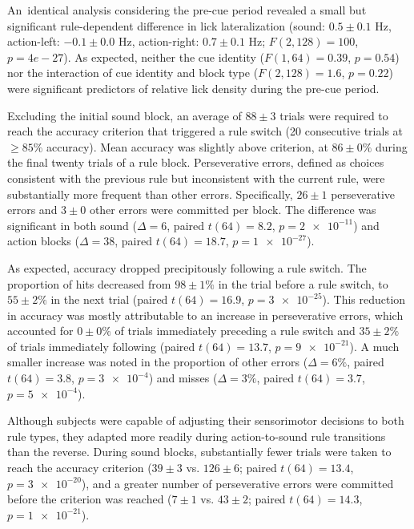 An\ identical analysis considering the pre-cue period revealed a small but significant  rule-dependent difference in lick lateralization (sound: $0.5 \pm 0.1$ Hz, action-left: $-0.1 \pm 0.0$ Hz, action-right: $0.7 \pm 0.1$ Hz; $F(2,128) =100$, $p=4e-27$). As expected, neither the cue identity ($F(1,64) =0.39$, $p=0.54$) nor the interaction of cue identity and block type ($F(2,128) =1.6$, $p=\num{0.22}$) were significant predictors of relative lick density during the pre-cue period.

Excluding the initial sound block, an average of $88 \pm 3$ trials were required to reach the accuracy criterion that triggered a rule switch (20 consecutive trials at $ \geq 85\%$ accuracy). Mean accuracy was slightly above criterion, at $86 \pm 0 \%$ during the final twenty trials of a rule block. Perseverative errors, defined as choices consistent with the previous rule but inconsistent with the current rule, were substantially more frequent than other errors. Specifically, $26 \pm 1$ perseverative errors and $3 \pm 0$ other errors were committed per block. The difference was significant in both sound ($\Delta=6$, paired $t(64) =8.2$, $p=\num{2e-11}$) and action blocks ($\Delta=38$, paired $t(64) =18.7$, $p=\num{1e-27}$).

As expected, accuracy dropped precipitously following a rule switch. The proportion of hits decreased from $98 \pm 1 \%$ in the trial before a rule switch, to $55 \pm 2 \%$ in the next trial (paired $t(64) =16.9$, $p=\num{3e-25}$). This reduction in accuracy was mostly attributable to an increase in perseverative errors, which accounted for $0 \pm 0 \%$ of trials immediately preceding a rule switch and $35 \pm 2 \%$ of trials immediately following (paired $t(64) =13.7$, $p=\num{9e-21}$). A much smaller increase was noted in the proportion of other errors ($\Delta=6\%$, paired $t(64) =3.8$, $p=\num{3e-4}$) and misses ($\Delta=3\%$, paired $t(64) =3.7$, $p=\num{5e-4}$).

Although subjects were capable of adjusting their sensorimotor decisions to both rule types, they adapted more readily during action-to-sound rule transitions than the reverse. During sound blocks, substantially fewer trials were taken to reach the accuracy criterion ($39 \pm 3$ vs. $126 \pm 6$; paired $t(64) =13.4$, $p=\num{3e-20}$), and a greater number of perseverative errors were committed before the criterion was reached ($7 \pm 1$ vs. $43 \pm 2$; paired $t(64) =14.3$, $p=\num{1e-21}$).




